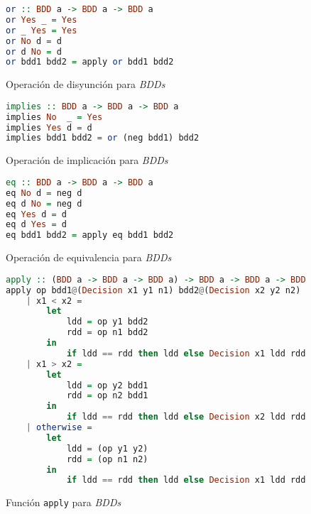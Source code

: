 \begin{figure}
\begin{lstlisting}[language=Haskell]
or :: BDD a -> BDD a -> BDD a
or Yes _ = Yes
or _ Yes = Yes
or No d = d
or d No = d
or bdd1 bdd2 = apply or bdd1 bdd2
\end{lstlisting}
\caption{Operación de disyunción para \textit{BDDs}}
\label{code:bdd_or}
\end{figure}

\begin{figure}
\begin{lstlisting}[language=Haskell]
implies :: BDD a -> BDD a -> BDD a
implies No  _ = Yes
implies Yes d = d
implies bdd1 bdd2 = or (neg bdd1) bdd2
\end{lstlisting}
\caption{Operación de implicación para \textit{BDDs}}
\label{code:bdd_implies}
\end{figure}

\begin{figure}
\begin{lstlisting}[language=Haskell]
eq :: BDD a -> BDD a -> BDD a
eq No d = neg d
eq d No = neg d
eq Yes d = d
eq d Yes = d
eq bdd1 bdd2 = apply eq bdd1 bdd2
\end{lstlisting}
\caption{Operación de equivalencia para \textit{BDDs}}
\label{code:bdd_eq}
\end{figure}


\begin{figure}
\begin{lstlisting}[language=Haskell]
apply :: (BDD a -> BDD a -> BDD a) -> BDD a -> BDD a -> BDD a
apply op bdd1@(Decision x1 y1 n1) bdd2@(Decision x2 y2 n2)
    | x1 < x2 =
        let
            ldd = op y1 bdd2
            rdd = op n1 bdd2
        in
            if ldd == rdd then ldd else Decision x1 ldd rdd
    | x1 > x2 =
        let
            ldd = op y2 bdd1
            rdd = op n2 bdd1
        in
            if ldd == rdd then ldd else Decision x2 ldd rdd
    | otherwise =
        let
            ldd = (op y1 y2)
            rdd = (op n1 n2)
        in
            if ldd == rdd then ldd else Decision x1 ldd rdd
\end{lstlisting}
\caption{Función \texttt{apply} para \textit{BDDs}}
\label{code:bdd_apply}
\end{figure}

